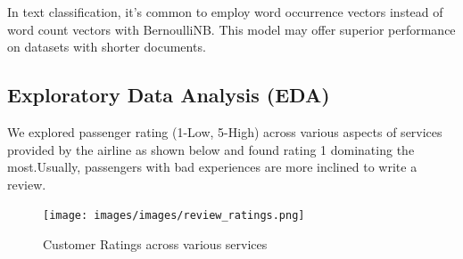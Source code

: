 \documentclass[11pt]{article} %
\begin{document}
In text classification, it's common to employ word occurrence vectors instead of word count vectors with BernoulliNB. This model may offer superior performance on datasets with shorter documents.
\subsection{Exploratory Data Analysis (EDA)}
We explored passenger rating (1-Low, 5-High) across various aspects of services provided by the airline as shown below and found rating 1 dominating the most.Usually, passengers with bad experiences are more inclined to write a review.
\begin{figure}[H]
    \centering
    \texttt{[image: images/images/review\_ratings.png]}
    \caption{Customer Ratings across various services}
    \label{fig:Customer Ratings across various services}
\end{figure}
\end{document}
